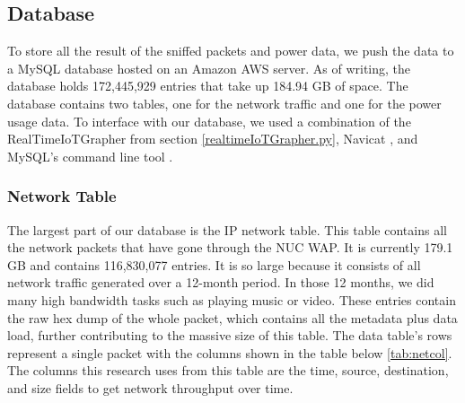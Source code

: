 \subsection{Database}
\label{Database}

To store all the result of the sniffed packets and power data, we push the data to a MySQL database hosted on an Amazon AWS server. As of writing, the database holds 172,445,929 entries that take up 184.94 GB of space. The database contains two tables, one for the network traffic and one for the power usage data. To interface with our database, we used a combination of the RealTimeIoTGrapher from section \ref{realtimeIoTGrapher.py}, Navicat \cite{navicat}, and MySQL’s command line tool \cite{mysqlCommandline}.

\subsubsection{Network Table}

The largest part of our database is the IP network table. This table contains all the network packets that have gone through the NUC WAP. It is currently 179.1 GB and contains 116,830,077 entries. It is so large because it consists of all network traffic generated over a 12-month period. In those 12 months, we did many high bandwidth tasks such as playing music or video. These entries contain the raw hex dump of the whole packet, which contains all the metadata plus data load, further contributing to the massive size of this table. The data table's rows represent a single packet with the columns shown in the table below \ref{tab:netcol}. The columns this research uses from this table are the time, source, destination, and size fields to get network throughput over time.

